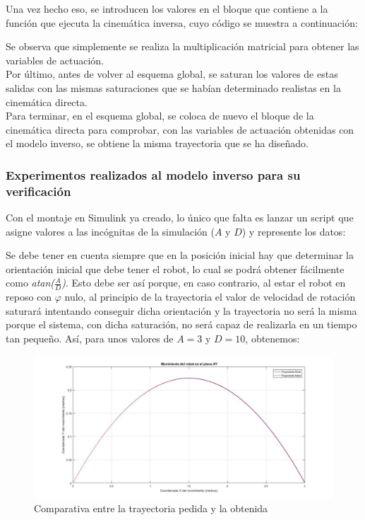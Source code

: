 \documentclass[a4paper,twoside]{article}
\begin{document}
\newpage
Una vez hecho eso, se introducen los valores en el bloque que contiene a la función que ejecuta la cinemática inversa, cuyo código se muestra a continuación:



Se observa que simplemente se realiza la multiplicación matricial para obtener las variables de actuación.\\

Por último, antes de volver al esquema global, se saturan los valores de estas salidas con las mismas saturaciones que se habían determinado realistas en la cinemática directa.\\
Para terminar, en el esquema global, se coloca de nuevo el bloque de la cinemática directa para comprobar, con las variables de actuación obtenidas con el modelo inverso, se obtiene la misma trayectoria que se ha diseñado.\\

\subsubsection{Experimentos realizados al modelo inverso para su verificación}
Con el montaje en Simulink ya creado, lo único que falta es lanzar un script que asigne valores a las incógnitas de la simulación ($A$ y $D$) y represente los datos:

Se debe tener en cuenta siempre que en la posición inicial hay que determinar la orientación inicial que debe tener el robot, lo cual se podrá obtener fácilmente como \textit{atan($\frac{A}{D}$)}. Esto debe ser así porque, en caso contrario, al estar el robot en reposo con $\varphi$ nulo, al principio de la trayectoria el valor de velocidad de rotación saturará intentando conseguir dicha orientación y la trayectoria no será la misma porque el sistema, con dicha saturación, no será capaz de realizarla en un tiempo tan pequeño. Así, para unos valores de $A=3$ y $D=10$, obtenemos:

\begin{figure}[H]
	\centering
	\includegraphics[width=1\textwidth]{parab_1}
	\caption{Comparativa entre la trayectoria pedida y la obtenida}
\end{figure}
\end{document}
